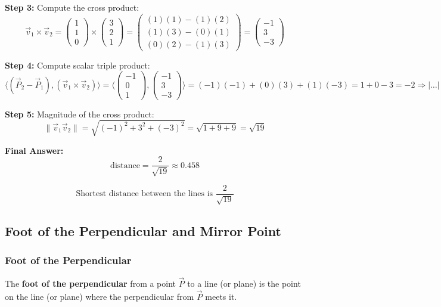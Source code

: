 \textbf{Step 3:} Compute the cross product:
\[
	\vec{v}_1 \times \vec{v}_2 =
	\begin{pmatrix} 1 \\ 1 \\ 0 \end{pmatrix} \times \begin{pmatrix} 3 \\ 2 \\ 1 \end{pmatrix}
	= \begin{pmatrix}
		(1)(1) - (1)(2) \\
		(1)(3) - (0)(1) \\
		(0)(2) - (1)(3)
	\end{pmatrix}
	= \begin{pmatrix}
		-1 \\ 3 \\ -3
	\end{pmatrix}
\]

\textbf{Step 4:} Compute scalar triple product:
\[
	\langle(\vec{P}_2 - \vec{P}_1), (\vec{v}_1 \times \vec{v}_2)\rangle =
	\langle\begin{pmatrix} -1 \\ 0 \\ 1 \end{pmatrix}, \begin{pmatrix} -1 \\ 3 \\ -3 \end{pmatrix}\rangle
	= (-1)(-1) + (0)(3) + (1)(-3) = 1 + 0 - 3 = -2
	\Rightarrow |\dots| = 2
\]

\textbf{Step 5:} Magnitude of the cross product:
\[
	\|\vec{v}_1  \vec{v}_2\|= \sqrt{(-1)^2 + 3^2 + (-3)^2} = \sqrt{1 + 9 + 9} = \sqrt{19}
\]

\textbf{Final Answer:}
\[
	\text{distance} = \frac{2}{\sqrt{19}} \approx 0.458
\]

\[
	\boxed{\text{Shortest distance between the lines is } \frac{2}{\sqrt{19}}}
\]

\subsection{Foot of the Perpendicular and Mirror Point}

\subsubsection{Foot of the Perpendicular}

The \textbf{foot of the perpendicular} from a point $\vec{P}$ to a line (or plane) is the point on the line (or plane) where the perpendicular from $\vec{P}$ meets it.

